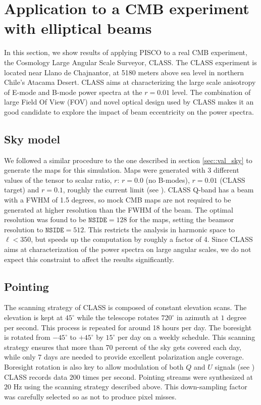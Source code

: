 \documentclass[a4paper,fleqn]{cas-dc}\sloppy
\begin{document}
	\section{Application to a CMB experiment with elliptical beams}
	\label{sec::class_pisco_sim}
	
	In this section, we show results of applying PISCO to a real CMB experiment, the Cosmology Large Angular Scale Surveyor, CLASS. The CLASS experiment is located near Llano de Chajnantor, at 5180 meters above sea level in northern Chile's Atacama Desert. CLASS aims at characterizing the large scale anisotropy of E-mode and B-mode power spectra at the $r=0.01$ level. The combination of large Field Of View (FOV) and novel optical design used by CLASS makes it an good candidate to explore the impact of beam eccentricity on the power spectra. 
	
	\subsection{Sky model}
	
	We followed a similar procedure to the one described in section \ref{sec::val_sky} to generate the maps for this simulation. Maps were generated with 3 different values of the tensor to scalar ratio, $r$: $r=0.0$ (no B-modes), $r=0.01$ (CLASS target) and $r=0.1$, roughly the current limit (see \cite{2018PhRvL.121v1301B}). CLASS Q-band has a beam with a FWHM of 1.5 degrees, so mock CMB maps are not required to be generated at higher resolution than the FWHM of the beam. The optimal resolution was found to be $\mathrm{\texttt{NSIDE}} = 128$ for the maps, setting the beamsor resolution to $\mathrm{\texttt{NSIDE}} = 512$. This restricts the analysis in harmonic space to $\ell < 350$, but speeds up the computation by roughly a factor of 4. Since CLASS aims at characterization of the power spectra on large angular scales, we do not expect this constraint to affect the results significantly.
	
	\subsection{Pointing}
	
	The scanning strategy of CLASS is composed of constant elevation scans. The elevation is kept at $45^{\circ}$ while the telescope rotates $720^\circ$ in azimuth at $1$ degree per second. This process is repeated for around 18 hours per day. The boresight is rotated from $-45^{\circ}$ to $+45^{\circ}$ by $15^{\circ}$ per day on a weekly schedule. This scanning strategy ensures that more than 70 percent of the sky gets covered each day, while only 7 days are needed to provide excellent polarization angle coverage. Boresight rotation is also key to allow modulation of both $Q$ and $U$ signals (see \cite{2016SPIE.9914E..1KH}) CLASS records data $200$ times per second. Pointing streams were synthesized at $20$ Hz using the scanning strategy described above. This down-sampling factor was carefully selected so as not to produce pixel misses. 
	
\end{document}
